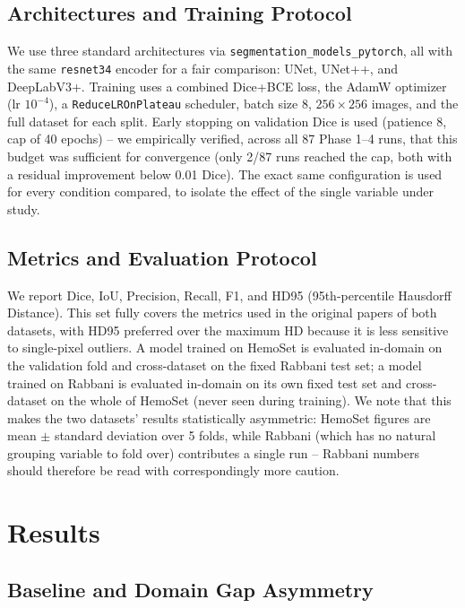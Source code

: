 \documentclass[10pt,conference]{IEEEtran}
\begin{document}
\subsection{Architectures and Training Protocol}

We use three standard architectures via \texttt{segmentation\_models\_pytorch}, all with the same \texttt{resnet34} encoder for a fair comparison: UNet, UNet++, and DeepLabV3+. Training uses a combined Dice+BCE loss, the AdamW optimizer (lr $10^{-4}$), a \texttt{ReduceLROnPlateau} scheduler, batch size 8, $256\times256$ images, and the full dataset for each split. Early stopping on validation Dice is used (patience 8, cap of 40 epochs) -- we empirically verified, across all 87 Phase 1--4 runs, that this budget was sufficient for convergence (only 2/87 runs reached the cap, both with a residual improvement below 0.01 Dice). The exact same configuration is used for every condition compared, to isolate the effect of the single variable under study.

\subsection{Metrics and Evaluation Protocol}

We report Dice, IoU, Precision, Recall, F1, and HD95 (95th-percentile Hausdorff Distance). This set fully covers the metrics used in the original papers of both datasets, with HD95 preferred over the maximum HD because it is less sensitive to single-pixel outliers. A model trained on HemoSet is evaluated in-domain on the validation fold and cross-dataset on the fixed Rabbani test set; a model trained on Rabbani is evaluated in-domain on its own fixed test set and cross-dataset on the whole of HemoSet (never seen during training). We note that this makes the two datasets' results statistically asymmetric: HemoSet figures are mean $\pm$ standard deviation over 5 folds, while Rabbani (which has no natural grouping variable to fold over) contributes a single run -- Rabbani numbers should therefore be read with correspondingly more caution.

\section{Results}

\subsection{Baseline and Domain Gap Asymmetry}
\label{sec:results-a}
\end{document}
